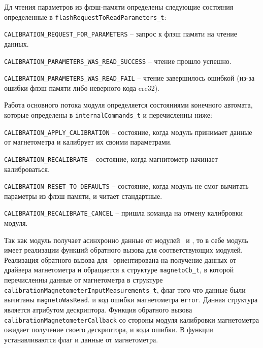 Дл чтения параметров из флэш-памяти определены следующие состояния определенные в \lstinline{flashRequestToReadParameters_t}:

\begin{enumerate_num}
    \item \lstinline{CALIBRATION_REQUEST_FOR_PARAMETERS} -- запрос к флэш памяти на чтение данных.
    \item \lstinline{CALIBRATION_PARAMETERS_WAS_READ_SUCCESS} -- чтение прошло успешно.
    \item \lstinline{CALIBRATION_PARAMETERS_WAS_READ_FAIL} -- чтение завершилось ошибкой (из-за ошибки флэш памяти либо неверного кода crc32).
\end{enumerate_num}

Работа основного потока модуля определяется состояниями конечного автомата, которые определены в \lstinline{internalCommands_t} и перечисленны ниже:

\begin{enumerate_num}
    \item \lstinline{CALIBRATION_APPLY_CALIBRATION} -- состояние, когда модуль принимает данные от магнетометра и калибрует их своими параметрами.
    \item \lstinline{CALIBRATION_RECALIBRATE} -- состояние, когда магнитометр начинает калиброваться.
    \item \lstinline{CALIBRATION_RESET_TO_DEFAULTS} -- состояние, когда модуль не смог вычитать параметры из флэш памяти, и читает стандартные.
    \item \lstinline{CALIBRATION_RECALIBRATE_CANCEL} -- пришла команда на отмену калибровки модуля.
\end{enumerate_num}

Так как модуль получает асинхронно данные от модулей \modulePerifery~и \moduleFlashMemory , то в себе модуль имеет реализации функций обратного вызова для соответствующих модулей.
Реализация обратного вызова для \modulePerifery~ориентирована на получение данных от драйвера магнетометра и обращается к структуре \lstinline{magnetoCb_t},
в которой перечисленны данные от магнетометра в структуре \lstinline{calibrationMagnetometerInputMeasurements_t}, флаг того что данные были вычитаны \lstinline{magnetoWasRead}.
и код ошибки магнетометра \lstinline{error}. Данная структура является атрибутом дескриптора. Функция обратного вызова \lstinline{calibrationMagnetometerCallback} 
со стороны модуля калибровки магнетометра ожидает получение своего дескриптора, и кода ошибки. В функции устанавливаются флаг и данные от магнетометра.


